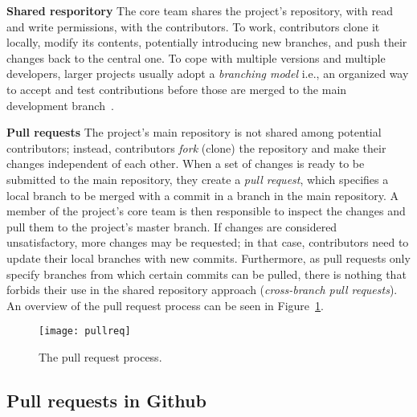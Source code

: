 \documentclass{sig-alternate}
\begin{document}
\textbf{Shared resporitory}
    The core team shares the project's repository, with read and write
    permissions, with the contributors. To work, contributors clone it locally,
    modify its contents, potentially introducing new branches, and push their
    changes back to the central one. To cope with multiple versions and multiple
    developers, larger projects usually adopt a {\em branching model} i.e., an
    organized way to accept and test contributions before those are merged to
    the main development branch~\cite{Bird12}. 
    

\textbf{Pull requests}
    The project's main repository is not shared among potential contributors;
    instead, contributors \emph{fork} (clone) the repository and make their
    changes independent of each other. When a set of changes is ready to be
    submitted to the main repository, they create a \emph{pull request}, which
    specifies a local branch to be merged with a commit in a branch in the main
    repository. A member of the project's core team is then responsible to
    inspect the changes and pull them to the project's master branch. If changes
    are considered unsatisfactory, more changes may be requested; in that case,
    contributors need to update their local branches with new commits.
    Furthermore, as pull requests only specify branches from which certain
    commits can be pulled, there is nothing that forbids their use in the shared
    repository approach (\emph{cross-branch pull requests}). An overview of the
    pull request process can be seen in Figure~\ref{fig:pullreq-process}.

    \begin{figure}[t]
      \begin{center}
        \texttt{[image: pullreq]}
      \end{center}
      \caption{The pull request process.}
      \label{fig:pullreq-process}
    \end{figure}

\subsection{Pull requests in Github}
\end{document}
